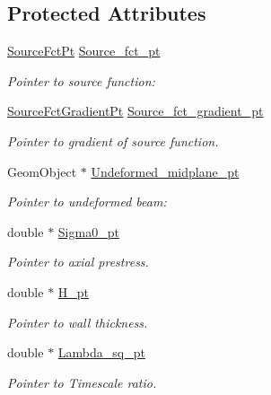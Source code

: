 \subsection*{Protected Attributes}
\begin{DoxyCompactItemize}
\item 
\hyperlink{classoomph_1_1MyShellEquations_a056d2488b6e65787f5c9935a321b7a9b}{Source\+Fct\+Pt} \hyperlink{classoomph_1_1MyShellEquations_a60988a3591e836a2afecf416d1287985}{Source\+\_\+fct\+\_\+pt}
\begin{DoxyCompactList}\small\item\em Pointer to source function\+: \end{DoxyCompactList}\item 
\hyperlink{classoomph_1_1MyShellEquations_a954dcc1b78710f331ed390b716aa07dd}{Source\+Fct\+Gradient\+Pt} \hyperlink{classoomph_1_1MyShellEquations_ab45cb2cb03c75c4410fa4288f9a8be90}{Source\+\_\+fct\+\_\+gradient\+\_\+pt}
\begin{DoxyCompactList}\small\item\em Pointer to gradient of source function. \end{DoxyCompactList}\item 
Geom\+Object $\ast$ \hyperlink{classoomph_1_1MyShellEquations_acf0107874213e70145eae84dfb3d4b5a}{Undeformed\+\_\+midplane\+\_\+pt}
\begin{DoxyCompactList}\small\item\em Pointer to undeformed beam\+: \end{DoxyCompactList}\item 
double $\ast$ \hyperlink{classoomph_1_1MyShellEquations_a909b1e9608109048d446f86ca3c7d02d}{Sigma0\+\_\+pt}
\begin{DoxyCompactList}\small\item\em Pointer to axial prestress. \end{DoxyCompactList}\item 
double $\ast$ \hyperlink{classoomph_1_1MyShellEquations_a6cd7175e7205dc7cea4e0e505f3cb8b9}{H\+\_\+pt}
\begin{DoxyCompactList}\small\item\em Pointer to wall thickness. \end{DoxyCompactList}\item 
double $\ast$ \hyperlink{classoomph_1_1MyShellEquations_a6201b3eced8396c6e2246df94c946537}{Lambda\+\_\+sq\+\_\+pt}
\begin{DoxyCompactList}\small\item\em Pointer to Timescale ratio. \end{DoxyCompactList}\end{DoxyCompactItemize}


